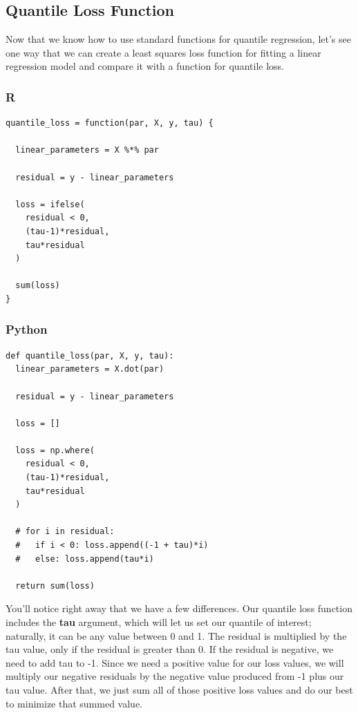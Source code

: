 \documentclass[
  letterpaper,
]{krantz}
\begin{document}
\subsection{Quantile Loss Function}\label{sec-quantile-loss}

Now that we know how to use standard functions for quantile regression,
let's see one way that we can create a least squares loss function for
fitting a linear regression model and compare it with a function for
quantile loss.

\subsubsection{R}

\begin{verbatim}
quantile_loss = function(par, X, y, tau) {
  
  linear_parameters = X %*% par
  
  residual = y - linear_parameters
  
  loss = ifelse(
    residual < 0, 
    (tau-1)*residual, 
    tau*residual
  )
  
  sum(loss)
}
\end{verbatim}

\subsubsection{Python}

\begin{verbatim}
def quantile_loss(par, X, y, tau):
  linear_parameters = X.dot(par)
  
  residual = y - linear_parameters
  
  loss = []
  
  loss = np.where(
    residual < 0, 
    (tau-1)*residual, 
    tau*residual
  )

  # for i in residual:
  #   if i < 0: loss.append((-1 + tau)*i)
  #   else: loss.append(tau*i)
  
  return sum(loss)
\end{verbatim}

You'll notice right away that we have a few differences. Our quantile
loss function includes the \textbf{tau} argument, which will let us set
our quantile of interest; naturally, it can be any value between 0 and
1. The residual is multiplied by the tau value, only if the residual is
greater than 0. If the residual is negative, we need to add tau to -1.
Since we need a positive value for our loss values, we will multiply our
negative residuals by the negative value produced from -1 plus our tau
value. After that, we just sum all of those positive loss values and do
our best to minimize that summed value.
\end{document}

